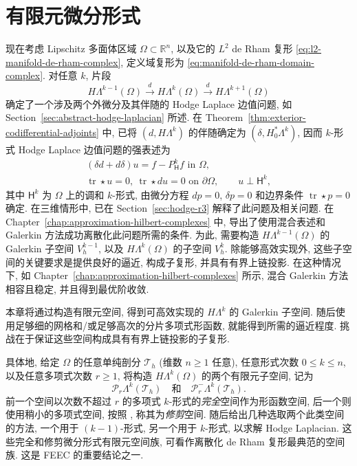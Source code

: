\clearpage\setcounter{chapter}{6}
\chapter{有限元微分形式}\label{chap:finite-element-differential-forms}

现在考虑 Lipschitz 多面体区域 $\Omega\subset\mathbb R^n$, 以及它的 $L^2$ de Rham 复形 \eqref{eq:l2-manifold-de-rham-complex}, 定义域复形为 \eqref{eq:manifold-de-rham-domain-complex}. 对任意 $k$, 片段
\begin{equation}\label{eq:finite-element-forms-short-complex}
H\Lambda^{k-1}(\Omega)\xrightarrow{d}H\Lambda^k(\Omega)\xrightarrow{d}H\Lambda^{k+1}(\Omega)
\end{equation}
确定了一个涉及两个外微分及其伴随的 Hodge Laplace 边值问题, 如 Section~\ref{sec:abstract-hodge-laplacian} 所述. 在 Theorem~\ref{thm:exterior-codifferential-adjoints} 中, 已将 $(d,H\Lambda^k)$ 的伴随确定为 $(\delta, H_{0}^*\Lambda^k)$, 因而 $k$-形式 Hodge Laplace 边值问题的强表述为
\begin{equation}\label{eq:finite-element-forms-hodge-strong}
\begin{gathered}
(\delta d+d\delta)u=f-P_{\mathsf H}^kf\text{ in }\Omega,\\
\operatorname{tr}\star u=0,\ \operatorname{tr}\star du=0\text{ on }\partial\Omega,\qquad u\perp\mathsf H^k,
\end{gathered}
\end{equation}
其中 $\mathsf H^k$ 为 $\Omega$ 上的调和 $k$-形式, 由微分方程 $dp=0$, $\delta p=0$ 和边界条件 $\operatorname{tr}\star p=0$ 确定. 在三维情形中, 已在 Section~\ref{sec:hodge-r3} 解释了此问题及相关问题. 在 Chapter~\ref{chap:approximation-hilbert-complexes} 中, 导出了使用混合表述和 Galerkin 方法成功离散化此问题所需的条件. 为此, 需要构造 $H\Lambda^{k-1}(\Omega)$ 的 Galerkin 子空间 $V_h^{k-1}$, 以及 $H\Lambda^k(\Omega)$ 的子空间 $V_h^k$. 除能够高效实现外, 这些子空间的关键要求是提供良好的逼近, 构成子复形, 并具有有界上链投影. 在这种情况下, 如 Chapter~\ref{chap:approximation-hilbert-complexes} 所示, 混合 Galerkin 方法相容且稳定, 并且得到最优阶收敛.

本章将通过构造有限元空间, 得到可高效实现的 $H\Lambda^k$ 的 Galerkin 子空间. 随后使用足够细的网格和/或足够高次的分片多项式形函数, 就能得到所需的逼近程度. 挑战在于保证这些空间构成具有有界上链投影的子复形.

具体地, 给定 $\Omega$ 的任意单纯剖分 $\mathcal T_h$ (维数 $n\geq1$ 任意), 任意形式次数 $0\leq k\leq n$, 以及任意多项式次数 $r\geq1$, 将构造 $H\Lambda^k(\Omega)$ 的两个有限元子空间, 记为
\[
\mathcal P_r\Lambda^k(\mathcal T_h)\quad{\text{和}}\quad\mathcal P_r^-\Lambda^k(\mathcal T_h).
\]
前一个空间以次数不超过 $r$ 的多项式 $k$-形式的\emph{完全}空间作为形函数空间, 后一个则使用稍小的多项式空间, 按照 , 称其为\emph{修剪}空间. 随后给出几种选取两个此类空间的方法, 一个用于 $(k-1)$-形式, 另一个用于 $k$-形式, 以求解 Hodge Laplacian. 这些完全和修剪微分形式有限元空间族, 可看作离散化 de Rham 复形最典范的空间族. 这是 FEEC 的重要结论之一.

